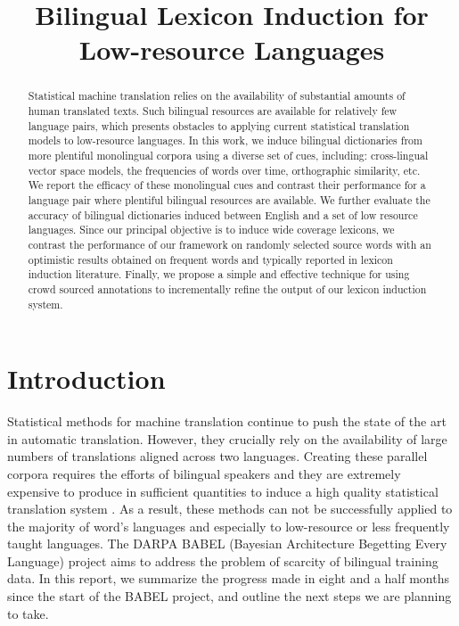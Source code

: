 \documentclass{article}
\title{Bilingual Lexicon Induction for Low-resource Languages}
\newcommand{\mtodo}[1]{}
\begin{document}
\maketitle

\begin{abstract}

Statistical machine translation relies on the availability of substantial amounts of human translated texts. Such bilingual resources are available for relatively few language pairs, which presents obstacles to applying current statistical translation models to low-resource languages. In this work, we induce bilingual dictionaries from more plentiful monolingual corpora using a diverse set of cues, including: cross-lingual vector space models, the frequencies of words over time, orthographic similarity, etc.  We report the efficacy of these monolingual cues and contrast their performance for a language pair where plentiful bilingual resources are available.  We further evaluate the accuracy of bilingual dictionaries induced between English and a set of low resource languages.  Since our principal objective is to induce wide coverage lexicons, we contrast the performance of our framework on randomly selected source words with an optimistic results obtained on frequent words and typically reported in lexicon induction literature.  Finally, we propose a simple and effective technique for using crowd sourced annotations to incrementally refine the output of our lexicon induction system.%
\end{abstract}

\section{Introduction}

Statistical methods for machine translation continue to push the state of the art in automatic translation. However, they crucially rely on the availability of large numbers of translations aligned across two languages. Creating these parallel corpora requires the efforts of bilingual speakers and they are extremely expensive to produce in sufficient quantities to induce a high quality statistical translation system \cite{Germann:2001, Oard:2003}.  As a result, these methods can not be successfully applied to the majority of word's languages and especially to low-resource or less frequently taught languages.  The DARPA BABEL (Bayesian Architecture Begetting Every Language) project aims to address the problem of scarcity of bilingual training data.  In this report, we summarize the progress made in eight and a half months since the start of the BABEL project, and outline the next steps we are planning to take.\\
\end{document}
